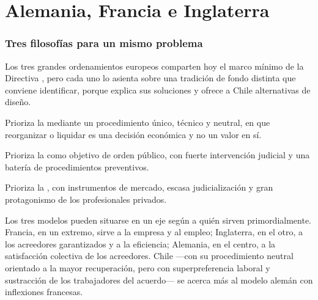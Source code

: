 \chapter{Alemania, Francia e Inglaterra}
\label{cap:comparado-europa-continental}


\bloqueTeorico

\subsection{Tres filosofías para un mismo problema}

Los tres grandes ordenamientos europeos comparten hoy el marco mínimo de la Directiva
\parencite{ue-directiva-2019-1023}, pero cada uno lo asienta sobre una tradición de fondo distinta
que conviene identificar, porque explica sus soluciones y ofrece a Chile alternativas de diseño.

\begin{description}[leftmargin=0pt,style=nextline,font=\sffamily\bfseries]
  \item[Alemania] Prioriza la  mediante un
  procedimiento único, técnico y neutral, en que reorganizar o liquidar es una decisión económica y
  no un valor en sí.
  \item[Francia] Prioriza la  como objetivo de
  orden público, con fuerte intervención judicial y una batería de procedimientos preventivos.
  \item[Inglaterra] Prioriza la ,
  con instrumentos de mercado, escasa judicialización y gran protagonismo de los profesionales
  privados.
\end{description}

\begin{foco}
Los tres modelos pueden situarse en un eje según a quién sirven primordialmente. Francia, en un
extremo, sirve a la empresa y al empleo; Inglaterra, en el otro, a los acreedores garantizados y a
la eficiencia; Alemania, en el centro, a la satisfacción colectiva de los acreedores. Chile ---con
su procedimiento neutral orientado a la mayor recuperación, pero con superpreferencia laboral y
sustracción de los trabajadores del acuerdo--- se acerca más al modelo alemán con inflexiones
francesas.
\end{foco}

